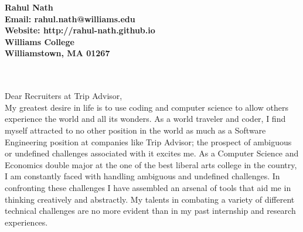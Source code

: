 \documentclass[11pt]{letter} %
\newcommand{\forceindent}{\leavevmode{\parindent=24pt\indent}}
\begin{document}



\begin{center}
\large\bf Rahul Nath \\ %
Email: rahul.nath@williams.edu \\ Website: http://rahul-nath.github.io \\ Williams College \\ Williamstown, MA 01267
\end{center}

\\ \\
Dear Recruiters at Trip Advisor,\\

\forceindent My greatest desire in life is to use coding and computer science to allow others experience the world and all its wonders. As a world traveler and coder, I find myself attracted to no other position in the world as much as a Software Engineering position at companies like Trip Advisor; the prospect of ambiguous or undefined challenges associated with it excites me. As a Computer Science and Economics double major at the one of the best liberal arts college in the country, I am constantly faced with handling ambiguous and undefined challenges. In confronting these challenges I have assembled an arsenal of tools that aid me in thinking creatively and abstractly. My talents in combating a variety of different technical challenges are no more evident than in my past internship and research experiences. \\
\end{document}
